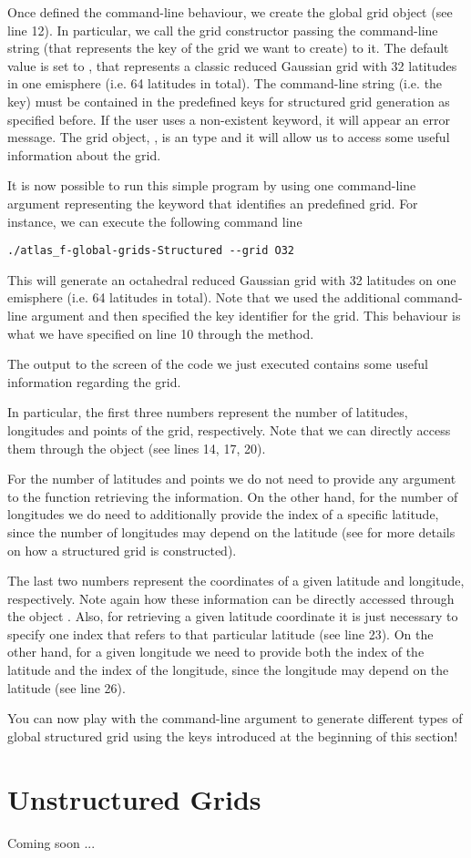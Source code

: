 %

%

Once defined the command-line behaviour, we create the global 
grid object (see line 12). In particular, we call 
the grid constructor passing the command-line string 
(that represents the key of the grid we want to create) to 
it. The default value is set to , that represents 
a classic reduced Gaussian grid with 32 latitudes in one emisphere 
(i.e. 64 latitudes in total).  
The command-line string (i.e. the key) must be contained 
in the predefined keys for structured grid generation as specified 
before. If the user uses a non-existent keyword, it will 
appear an error message.
The grid object, , is 
an  type and it will allow 
us to access some useful information about the grid.  

It is now possible to run this simple program by using 
one command-line argument representing the keyword that 
identifies an \Atlas predefined grid. For instance, we 
can execute the following command line 
%
\begin{lstlisting}[style=BashStyle]
./atlas_f-global-grids-Structured --grid O32
\end{lstlisting}
% 
This will generate an octahedral reduced Gaussian grid 
with 32 latitudes on one emisphere (i.e. 64 latitudes 
in total).
Note that we used the additional command-line argument 
 and then specified the key identifier 
for the grid. This behaviour is what we have specified 
on line 10 through the  method.

The output to the screen of the code we just executed 
contains some useful information regarding the grid.

In particular, the first three numbers represent the 
number of latitudes, longitudes and points of the grid,
respectively. Note that we can directly access them 
through the  object (see lines 14, 17, 20).
%
\begin{tipbox}
For the number of latitudes and points we do not need to provide
any argument to the function retrieving the information. On the 
other hand, for the number of longitudes we do need to additionally 
provide the index of a specific latitude, since the number of 
longitudes may depend on the latitude (see  
for more details on how a structured grid is constructed). 
\end{tipbox}
%
The last two numbers represent the coordinates of a given 
latitude and longitude, respectively. Note again how these 
information can be directly accessed through the object 
. 
Also, for retrieving a given latitude coordinate it is just 
necessary to specify one index that refers to that particular 
latitude (see line 23). On the other hand, for a given longitude 
we need to provide both the index of the latitude and the index 
of the longitude, since the longitude may depend on the latitude 
(see line 26).

You can now play with the command-line argument to generate 
different types of global structured grid using the keys introduced 
at the beginning of this section!



\section{Unstructured Grids}
Coming soon ...
